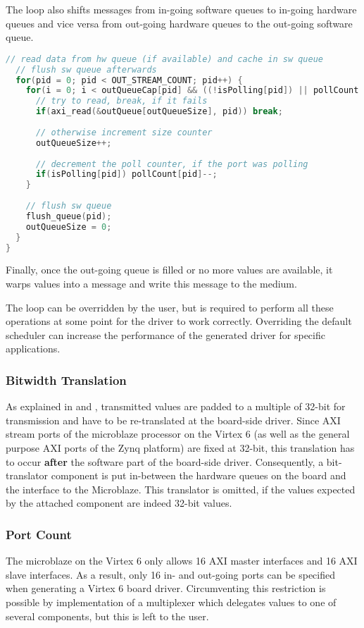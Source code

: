 \documentclass{report}
\begin{document}
The loop also shifts messages from in-going software queues to in-going hardware queues and vice versa from out-going hardware queues to the out-going software queue.

\begin{lstlisting}[language=c, breaklines=true]
  // read data from hw queue (if available) and cache in sw queue
  // flush sw queue afterwards
  for(pid = 0; pid < OUT_STREAM_COUNT; pid++) {
    for(i = 0; i < outQueueCap[pid] && ((!isPolling[pid]) || pollCount[pid] > 0); i++) {
      // try to read, break, if it fails
      if(axi_read(&outQueue[outQueueSize], pid)) break;
      
      // otherwise increment size counter
      outQueueSize++;
      
      // decrement the poll counter, if the port was polling
      if(isPolling[pid]) pollCount[pid]--;
    }
    
    // flush sw queue
    flush_queue(pid);
    outQueueSize = 0;
  }
}
\end{lstlisting}

Finally, once the out-going queue is filled or no more values are available, it warps values into a message and write this message to the medium.

The loop can be overridden by the user, but is required to perform all these operations at some point for the driver to work correctly. Overriding the default scheduler can increase the performance of the generated driver for specific applications.

\subsubsection{Bitwidth Translation}
As explained in  and , transmitted values are padded to a multiple of 32-bit for transmission and have to be re-translated at the board-side driver.
Since AXI stream ports of the microblaze processor on the Virtex 6 (as well as the general purpose AXI ports of the Zynq platform) are fixed at 32-bit, this translation has to occur \textbf{after} the software part of the board-side driver. Consequently, a bit-translator component is put in-between the hardware queues on the board and the interface to the Microblaze. This translator is omitted, if the values expected by the attached component are indeed 32-bit values.

\subsubsection{Port Count}
The microblaze on the Virtex 6 only allows 16 AXI master interfaces and 16 AXI slave interfaces. As a result, only 16 in- and out-going ports can be specified when generating a Virtex 6 board driver. Circumventing this restriction is possible by implementation of a multiplexer which delegates values to one of several components, but this is left to the user.
\end{document}
